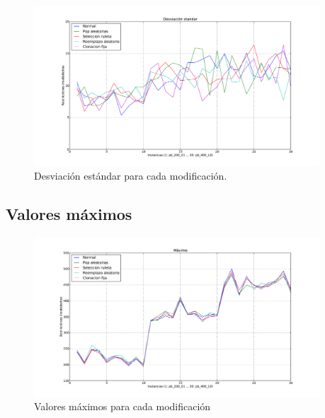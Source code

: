 \begin{figure}[H]
\begin{center}
\includegraphics[width=0.95\textwidth]{img/s.pdf}
\end{center}
\caption{Desviación estándar para cada modificación.}
\label{fig:s}
\end{figure}

\newpage

\subsection{Valores máximos}

\begin{figure}[H]
\begin{center}
\includegraphics[width=0.95\textwidth]{img/max.pdf}
\end{center}
\caption{Valores máximos para cada modificación}
\label{fig:max}
\end{figure}

